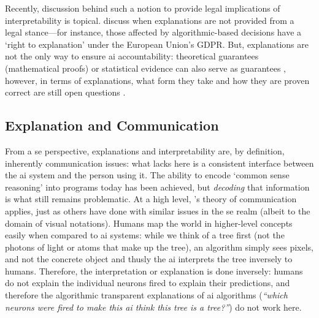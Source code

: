 Recently, discussion behind such a notion to provide legal implications of interpretability is topical. \citet{DoshiVelez:2017vm} discuss when explanations are not provided from a legal stance---for instance, those affected by algorithmic-based decisions have a `right to explanation' \citep{Goodman:2016wf,Wachter:2017hx} under the European Union's GDPR. But, explanations are not the only way to ensure \gls{ai} accountability: theoretical guarantees (mathematical proofs) or statistical evidence can also serve as guarantees \citep{DoshiVelez:2017vm}, however, in terms of explanations, what form they take and how they are proven correct are still open questions \citep{Lipton:2016if}.

\subsection{Explanation and Communication}
\label{ssec:literature-review:probabilistic-stochastic:communication}

From a \gls{se} perspective, explanations and interpretability are, by definition, inherently communication issues: what lacks here is a consistent interface between the \gls{ai} system and the person using it. The ability to encode `common sense reasoning' \citep{McCarthy:1960:PCS:889202} into programs today has been achieved, but \textit{decoding} that information is what still remains problematic. At a high level, \citeauthor{Shannon:1963ti}'s theory of communication \citep{Shannon:1963ti} applies, just as others have done with similar issues in the \gls{se} realm \citep{Moody:2009vo,Wickham:2010hy} (albeit to the domain of visual notations). Humans map the world in higher-level concepts easily when compared to \gls{ai} systems: while we think of a tree first (not the photons of light or atoms that make up the tree), an algorithm simply sees pixels, and not the concrete object \citep{DoshiVelez:2017vm} and thusly the \gls{ai} interprets the tree inversely to humans. Therefore, the interpretation or explanation is done inversely: humans do not explain the individual neurons fired to explain their predictions, and therefore the algorithmic transparent explanations of \gls{ai} algorithms (\textit{``which neurons were fired to make this \gls{ai} think this tree is a tree?''}) do not work here.


